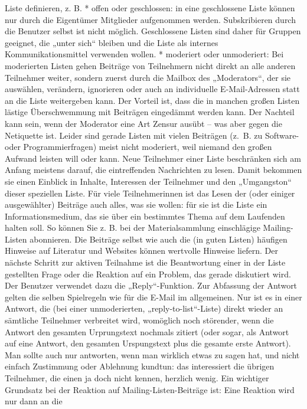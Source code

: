 \documentclass[]{book}
\theoremstyle{definition}
\theoremstyle{definition}
\theoremstyle{definition}
\theoremstyle{remark}
\begin{document}
Liste definieren, z. B. * offen oder geschlossen: in eine geschlossene
Liste können nur durch die Eigentümer Mitglieder aufgenommen werden.
Subskribieren durch die Benutzer selbst ist nicht möglich. Geschlossene
Listen sind daher für Gruppen geeignet, die „unter sich`` bleiben und
die Liste als internes Kommunikationsmittel verwenden wollen. *
moderiert oder unmoderiert: Bei moderierten Listen gehen Beiträge von
Teilnehmern nicht direkt an alle anderen Teilnehmer weiter, sondern
zuerst durch die Mailbox des „Moderators``, der sie auswählen,
verändern, ignorieren oder auch an individuelle E-Mail-Adressen statt an
die Liste weitergeben kann. Der Vorteil ist, dass die in manchen großen
Listen lästige Überschwemmung mit Beiträgen eingedämmt werden kann. Der
Nachteil kann sein, wenn der Moderator eine Art Zensur ausübt -- was
aber gegen die Netiquette ist. Leider sind gerade Listen mit vielen
Beiträgen (z.~B. zu Software- oder Programmierfragen) meist nicht
moderiert, weil niemand den großen Aufwand leisten will oder kann. Neue
Teilnehmer einer Liste beschränken sich am Anfang meistens darauf, die
eintreffenden Nachrichten zu lesen. Damit bekommen sie einen Einblick in
Inhalte, Interessen der Teilnehmer und den „Umgangston`` dieser
speziellen Liste. Für viele Teilnehmerinnen ist das Lesen der (oder
einiger ausgewählter) Beiträge auch alles, was sie wollen: für sie ist
die Liste ein Informationsmedium, das sie über ein bestimmtes Thema auf
dem Laufenden halten soll. So können Sie z. B. bei der Materialsammlung
einschlägige Mailing-Listen abonnieren. Die Beiträge selbst wie auch die
(in guten Listen) häufigen Hinweise auf Literatur und Websites können
wertvolle Hinweise liefern. Der nächste Schritt zur aktiven Teilnahme
ist die Beantwortung einer in der Liste gestellten Frage oder die
Reaktion auf ein Problem, das gerade diskutiert wird. Der Benutzer
verwendet dazu die „Reply``-Funktion. Zur Abfassung der Antwort gelten
die selben Spielregeln wie für die E-Mail im allgemeinen. Nur ist es in
einer Antwort, die (bei einer unmoderierten, „reply-to-list``-Liste)
direkt wieder an sämtliche Teilnehmer verbreitet wird, womöglich noch
störender, wenn die Antwort den gesamten Urprungstext nochmals zitiert
(oder sogar, als Antwort auf eine Antwort, den gesamten Urspungstext
plus die gesamte erste Antwort). Man sollte auch nur antworten, wenn man
wirklich etwas zu sagen hat, und nicht einfach Zustimmung oder Ablehnung
kundtun: das interessiert die übrigen Teilnehmer, die einen ja doch
nicht kennen, herzlich wenig. Ein wichtiger Grundsatz bei der Reaktion
auf Mailing-Listen-Beiträge ist: Eine Reaktion wird nur dann an die
\end{document}
